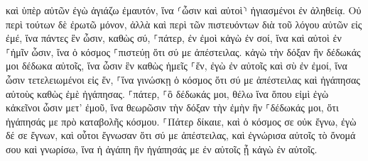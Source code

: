 \documentclass{openreader}
\begin{document}
καὶ ὑπὲρ αὐτῶν ἐγὼ ἁγιάζω ἐμαυτόν, ἵνα ⸂ὦσιν καὶ αὐτοὶ⸃ ἡγιασμένοι ἐν ἀληθείᾳ. 
Οὐ περὶ τούτων δὲ ἐρωτῶ μόνον, ἀλλὰ καὶ περὶ τῶν πιστευόντων διὰ τοῦ λόγου αὐτῶν εἰς ἐμέ, 
ἵνα πάντες ἓν ὦσιν, καθὼς σύ, ⸀πάτερ, ἐν ἐμοὶ κἀγὼ ἐν σοί, ἵνα καὶ αὐτοὶ ἐν ⸀ἡμῖν ὦσιν, ἵνα ὁ κόσμος ⸀πιστεύῃ ὅτι σύ με ἀπέστειλας. 
κἀγὼ τὴν δόξαν ἣν δέδωκάς μοι δέδωκα αὐτοῖς, ἵνα ὦσιν ἓν καθὼς ἡμεῖς ⸀ἕν, 
ἐγὼ ἐν αὐτοῖς καὶ σὺ ἐν ἐμοί, ἵνα ὦσιν τετελειωμένοι εἰς ἕν, ⸀ἵνα γινώσκῃ ὁ κόσμος ὅτι σύ με ἀπέστειλας καὶ ἠγάπησας αὐτοὺς καθὼς ἐμὲ ἠγάπησας. 
⸀πάτερ, ⸀ὃ δέδωκάς μοι, θέλω ἵνα ὅπου εἰμὶ ἐγὼ κἀκεῖνοι ὦσιν μετ’ ἐμοῦ, ἵνα θεωρῶσιν τὴν δόξαν τὴν ἐμὴν ἣν ⸀δέδωκάς μοι, ὅτι ἠγάπησάς με πρὸ καταβολῆς κόσμου. 
⸀Πάτερ δίκαιε, καὶ ὁ κόσμος σε οὐκ ἔγνω, ἐγὼ δέ σε ἔγνων, καὶ οὗτοι ἔγνωσαν ὅτι σύ με ἀπέστειλας, 
καὶ ἐγνώρισα αὐτοῖς τὸ ὄνομά σου καὶ γνωρίσω, ἵνα ἡ ἀγάπη ἣν ἠγάπησάς με ἐν αὐτοῖς ᾖ κἀγὼ ἐν αὐτοῖς. 
\end{document}
